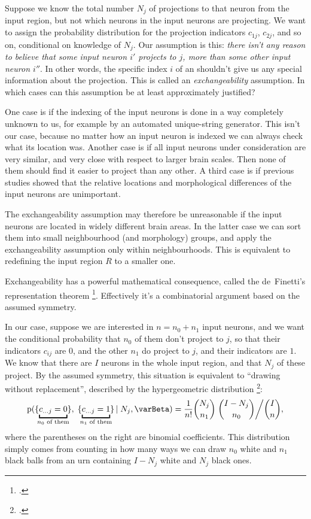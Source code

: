 \documentclass[\ifafour a4paper,12pt,\else a5paper,10pt,\fi%
onecolumn,oneside,article,%
british%
]{memoir}
\theoremstyle{remark}
\theoremstyle{innote}
\newcommand*{\citep}{\footcites}
\newcommand*{\pf}{\mathrm{p}}%
\renewcommand*{\|}[1][]{\nonscript\,#1\vert\nonscript\;\mathopen{}}
\newcommand*{\chap}{ch.}%
\newcommand*{\yI}{\varBeta}
\DeclarePairedDelimiter\tu{\{}{\}}
\begin{document}
Suppose we know the total number $N_{j}$ of projections to that neuron from
the input region, but not which neurons in the input neurons are
projecting. We want to assign the probability distribution for the
projection indicators $c_{1j}$, $c_{2j}$, and so on, conditional on
knowledge of $N_{j}$. Our assumption is this: \emph{there isn't any reason
  to believe that some input neuron $i'$ projects to $j$, more than some
  other input neuron $i''$}. In other words, the specific index $i$ of an
shouldn't give us any special information about the projection. This is
called an \emph{exchangeability} assumption.  In
which cases can this assumption be at least approximately justified?

One case is if the indexing of the input neurons is done in a way
completely unknown to us, for example by an automated unique-string
generator. This isn't our case, because no matter how an input neuron is
indexed we can always check what its location was. Another case is if all
input neurons under consideration are very similar, and very close with
respect to larger brain scales. Then none of them should find it easier to
project than any other. A third case is if previous studies showed that the
relative locations and morphological differences of the input neurons are
unimportant.

The exchangeability assumption may therefore be unreasonable if the input
neurons are located in widely different brain areas. In the latter case we
can sort them into small neighbourhood (and morphology) groups, and apply
the exchangeability assumption only within neighbourhoods. This is
equivalent to redefining the input region $R$ to a smaller one.

Exchangeability has a powerful mathematical consequence, called the
de~Finetti's representation theorem \citep{definetti1930,hewittetal1955}[a
more intuitive explanation is in][]{heathetal1976}[for an informative
review:][]{dawid2013}[the particular form used here is discussed
in][]{diaconis1977,diaconisetal1980}. Effectively it's a combinatorial
argument based on the assumed symmetry.

In our case, suppose we are interested in $n=n_{0}+n_{1}$ input neurons,
and we want the conditional probability that $n_{0}$ of them don't project
to $j$, so that their indicators $c_{ij}$ are $0$, and the other $n_{1}$
do project to $j$, and their indicators are $1$. We know that there are $I$
neurons in the whole input region, and that $N_{j}$ of these project. By
the assumed symmetry, this situation is equivalent to \enquote{drawing
  without replacement}, described by the hypergeometric distribution \citep[\chap~3]{jaynes1994_r2003}:
\begin{equation}
  \label{eq:hyperg_Nj}
  \pf(\tu{\underbracket{c_{\dotso j}=0}_{\mathclap{\text{$n_{0}$ of them}}}},
  \;\tu{\underbracket{c_{\dotso j}=1}_{\mathclap{\text{$n_{1}$ of them}}}} \| N_{j}, \yI)
  =
\frac{1}{n!}  \binom{N_{j}}{n_{1}}\;\binom{I-N_{j}}{n_{0}}\bigg/ \binom{I}{n},
\end{equation}
where the parentheses on the right are binomial coefficients. This
distribution simply comes from counting in how many ways we can draw
$n_{0}$ white and $n_{1}$ black balls from an urn containing $I-N_{j}$
white and $N_{j}$ black ones.
\end{document}
